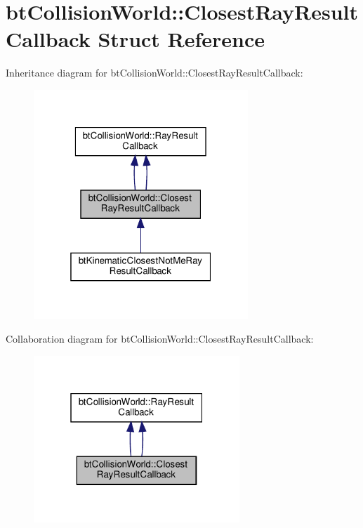\hypertarget{structbtCollisionWorld_1_1ClosestRayResultCallback}{}\section{bt\+Collision\+World\+:\+:Closest\+Ray\+Result\+Callback Struct Reference}
\label{structbtCollisionWorld_1_1ClosestRayResultCallback}


Inheritance diagram for bt\+Collision\+World\+:\+:Closest\+Ray\+Result\+Callback\+:
\nopagebreak
\begin{figure}[H]
\begin{center}
\leavevmode
\includegraphics[width=229pt]{structbtCollisionWorld_1_1ClosestRayResultCallback__inherit__graph}
\end{center}
\end{figure}


Collaboration diagram for bt\+Collision\+World\+:\+:Closest\+Ray\+Result\+Callback\+:
\nopagebreak
\begin{figure}[H]
\begin{center}
\leavevmode
\includegraphics[width=220pt]{structbtCollisionWorld_1_1ClosestRayResultCallback__coll__graph}
\end{center}
\end{figure}
